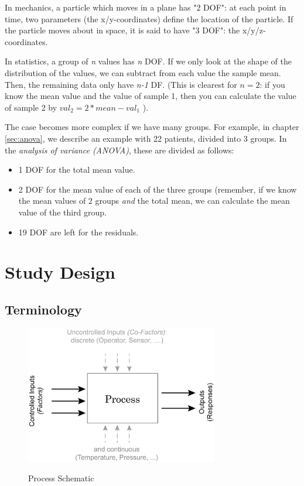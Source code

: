 In mechanics, a particle which moves in a plane has "2 DOF": at each point in time, two parameters (the x/y-coordinates) define the location of the particle. If the particle moves about in space, it is said to have "3 DOF": the x/y/z-coordinates.

In statistics, a group of \emph{n} values has \emph{n} DOF. If we only look at the shape of the distribution of the values, we can subtract from each value the sample mean. Then, the remaining data only have \emph{n-1} DF. (This is clearest for $n=2$: if you know the mean value and the value of sample 1, then you can calculate the value of sample 2 by $val_2 = 2*mean - val_1$ ).

The case becomes more complex if we have many groups. For example, in chapter \ref{sec:anova}, we describe an example with 22 patients, divided into 3 groups. In the \emph{analysis of variance (ANOVA)}, these are divided as follows:

\begin{itemize}
  \item 1 DOF for the total mean value.
  \item 2 DOF for the mean value of each of the three groups (remember, if we know the mean values of 2 groups \emph{and} the total mean, we can calculate the mean value of the third group.
  \item 19 DOF are left for the residuals.
\end{itemize}

\section{Study Design}

\subsection{Terminology}

\begin{figure}
  \centering
  \includegraphics[width=0.75\textwidth]{../Images/Process_Optimization.jpg}\\
  \caption{Process Schematic}\label{fig:StudyDesign}
\end{figure}

